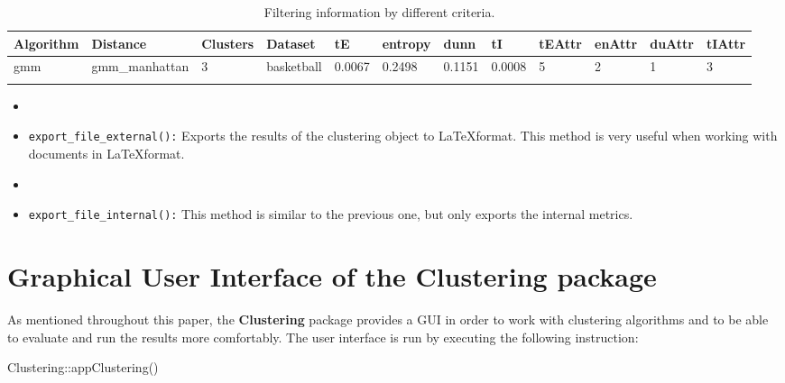 \documentclass[
]{article}
\newenvironment{Shaded}{\begin{snugshade}}{\end{snugshade}}
\newcommand{\FunctionTok}[1]{\textcolor[rgb]{0.00,0.00,0.00}{#1}}
\newcommand{\NormalTok}[1]{#1}
\newcommand{\SpecialCharTok}[1]{\textcolor[rgb]{0.00,0.00,0.00}{#1}}
\begin{document}
\begin{longtable}{| p{1.1cm} | p{2cm} | p{0.8cm} | p{1.3cm} | p{0.60cm} | p{0.7cm} | p{0.65cm} | p{0.65cm} | p{0.65cm} | p{0.65cm} | p{0.7cm} | p{0.65cm} |}
\hline
\scriptsize  Algorithm & \scriptsize  Distance  &  \scriptsize Clusters & \scriptsize  Dataset & \scriptsize tE & \scriptsize entropy & \scriptsize  dunn  & \scriptsize tI & \scriptsize tEAttr & \scriptsize enAttr & \scriptsize duAttr & \scriptsize tIAttr  \\
\hline
\scriptsize    gmm     & \scriptsize  gmm\_manhattan & \scriptsize      3  & \scriptsize   basketball  & \scriptsize   0.0067  & \scriptsize  0.2498  & \scriptsize 0.1151  & \scriptsize    0.0008     & \scriptsize     5       & \scriptsize       2    & \scriptsize      1      & \scriptsize      3 \\
\hline
\caption{Filtering information by different criteria.}
\label{tab:filtering}
\end{longtable}

\begin{itemize}
\item
  \item

  \texttt{export\_file\_external():} Exports the results of the
  clustering object to \LaTeX format. This method is very useful when
  working with documents in \LaTeX format.
\item
  \item

  \texttt{export\_file\_internal():} This method is similar to the
  previous one, but only exports the internal metrics.
\end{itemize}

\hypertarget{graphical-user-interface-of-the-clustering-package}{%
\section{\texorpdfstring{Graphical User Interface of the
\textbf{Clustering}
package}{Graphical User Interface of the Clustering package}}\label{graphical-user-interface-of-the-clustering-package}}

As mentioned throughout this paper, the \textbf{Clustering} package
provides a GUI in order to work with clustering algorithms and to be
able to evaluate and run the results more comfortably. The user
interface is run by executing the following instruction:

\begin{Shaded}
\begin{Highlighting}[]
\NormalTok{Clustering}\SpecialCharTok{::}\FunctionTok{appClustering}\NormalTok{()}
\end{Highlighting}
\end{Shaded}
\end{document}
